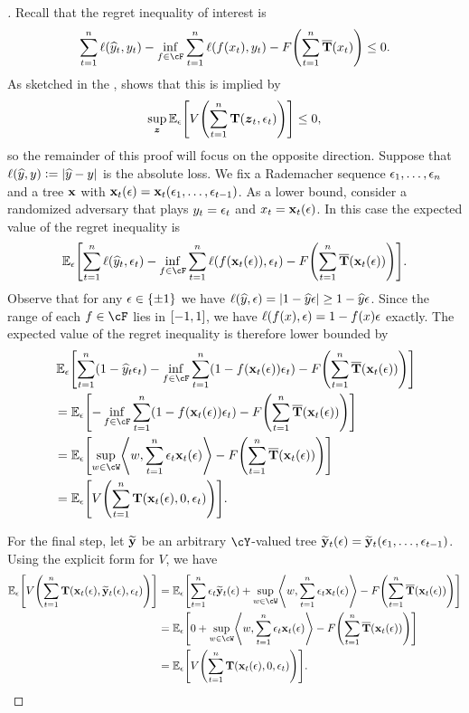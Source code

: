 \begin{proof}[]
Recall that the regret inequality of interest is
\[
\sum_{t=1}^{n}\ls(\yh_t, y_t) - \inf_{f\in\cF}\sum_{t=1}^n \loss(f(x_t),y_t) - F\prn*{\sum_{t=1}^{n}\overline{\suff}(x_t)} \leq{} 0.
\]
As sketched in the ,  shows that this is implied by
\begin{equation}
\sup_{\mb{z}}\En_{\eps}\brk*{V\prn*{\sum_{t=1}^{n}\suff(\mb{z}_t, \eps_t)}}\leq{}0,
\end{equation}
so the remainder of this proof will focus on the opposite direction. Suppose that $\ls(\yh,y)\ldef\abs*{\yh-y}$ is the absolute loss. We fix a Rademacher sequence $\eps_{1},\ldots,\eps_{n}$ and a tree $\x$ with $\x_{t}(\eps)=\x_{t}(\eps_{1},\ldots,\eps_{t-1})$. As a lower bound, consider a randomized adversary that plays $y_{t}=\eps_{t}$ and $x_{t} = \x_{t}(\eps)$. In this case the expected value of the regret inequality is
\[
\En_{\eps}\brk*{
\sum_{t=1}^{n}\ls(\yh_t, \eps_t) - \inf_{f\in\cF}\sum_{t=1}^n \loss(f(\x_t(\eps)),\eps_t) - F\prn*{\sum_{t=1}^{n}\overline{\suff}(\x_t(\eps))}
}.
\]
Observe that for any $\eps\in\pmo$ we have $\ls(\yh, \eps) = \abs*{1-\yh\eps}\geq{}1-\yh\eps$. Since the range of each $f\in\cF$ lies in $\brk*{-1,1}$, we have $\ls(f(x), \eps)=1-f(x)\eps$ exactly. The expected value of the regret inequality is therefore lower bounded by
\begin{align*}
&\En_{\eps}\brk*{
\sum_{t=1}^{n}(1-\yh_t\eps_t) - \inf_{f\in\cF}\sum_{t=1}^n (1-f(\x_t(\eps))\eps_t) - F\prn*{\sum_{t=1}^{n}\overline{\suff}(\x_t(\eps))}
} \\
&= \En_{\eps}\brk*{
- \inf_{f\in\cF}\sum_{t=1}^n (1-f(\x_t(\eps))\eps_t) - F\prn*{\sum_{t=1}^{n}\overline{\suff}(\x_t(\eps))}
} \\
&= \En_{\eps}\brk*{
\sup_{w\in\cW}\tri*{w, \sum_{t=1}^n\eps_{t}\x_{t}(\eps)} - F\prn*{\sum_{t=1}^{n}\overline{\suff}(\x_t(\eps))}
} \\
&= \En_{\eps}\brk*{
V\prn*{\sum_{t=1}^{n}\suff(\x_{t}(\eps), 0, \eps_t)
}}.
\end{align*}

For the final step, let $\wt{\y}$ be an arbitrary $\cY$-valued tree $\wt{\y}_{t}(\eps) = \wt{\y}_{t}(\eps_1,\ldots,\eps_{t-1})$. Using the explicit form for $V$, we have
\begin{align*}
\En_{\eps}\brk*{
V\prn*{\sum_{t=1}^{n}\suff(\x_{t}(\eps), \wt{\y}_{t}(\eps), \eps_t)
}}
&= \En_{\eps}\brk*{
\sum_{t=1}^{n}\eps_{t}\wt{\y}_{t}(\eps) + 
\sup_{w\in\cW}\tri*{w, \sum_{t=1}^n\eps_{t}\x_{t}(\eps)} - F\prn*{\sum_{t=1}^{n}\overline{\suff}(\x_t(\eps))}
} \\
&= \En_{\eps}\brk*{
0 + 
\sup_{w\in\cW}\tri*{w, \sum_{t=1}^n\eps_{t}\x_{t}(\eps)} - F\prn*{\sum_{t=1}^{n}\overline{\suff}(\x_t(\eps))}
} \\
& = \En_{\eps}\brk*{
V\prn*{\sum_{t=1}^{n}\suff(\x_{t}(\eps), 0, \eps_t)
}}.
\end{align*}


\end{proof}
